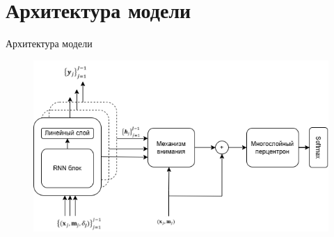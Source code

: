 \documentclass[10pt,pdf,hyperref={unicode}]{beamer}
\renewcommand{\figurename}{}{}%
\renewcommand{\figurename}{\relax}%
\begin{document}
\section{Архитектура модели}
\begin{frame}{Архитектура модели }
	
	
	\begin{figure}[h!]
		
		\begin{minipage}{0.8\textwidth}
			\centering
			\includegraphics[width=\linewidth]{../figures/dynamic_deephit_scheme_only_architecture.png}
			\renewcommand{\figurename}{}{}%
		\end{minipage}
	\end{figure}
	
	
\end{frame}

\end{document}
